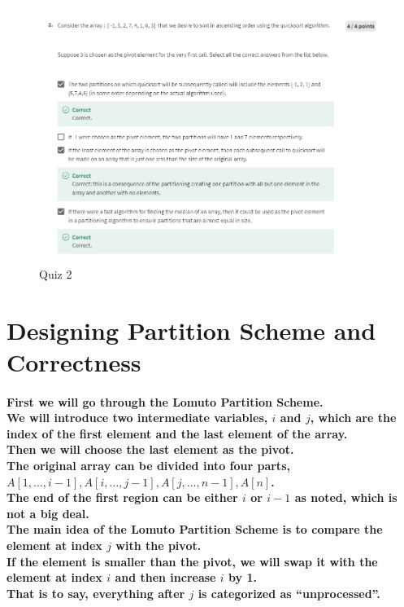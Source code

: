 \documentclass{article}
\begin{document}
\begin{figure}[H]
    \includegraphics[width=\textwidth]{week3quicksortquiz2.png}
    \caption{Quiz 2\\}
\end{figure}

\section{Designing Partition Scheme and Correctness}

\paragraph{First we will go through the Lomuto Partition Scheme.\\
We will introduce two intermediate variables, $i$ and $j$, which are the index of the first element 
and the last element of the array.\\
Then we will choose the last element as the pivot.\\
The original array can be divided into four parts, 
$A[1, \ldots ,i-1], A[i, \ldots ,j-1], A[j, \ldots ,n-1], A[n]$.\\
The end of the first region can be either $i$ or $i-1$ as noted, which is not a big deal.\\
The main idea of the Lomuto Partition Scheme is to compare the element at index $j$ with the pivot.\\
If the element is smaller than the pivot, we will swap it with the element at index $i$ and then increase $i$ by 1.\\
That is to say, everything after $j$ is categorized as ``unprocessed''.}
\end{document}

